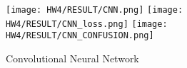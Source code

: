 \documentclass[letter, 10pt]{article}
\begin{document}
\begin{figure}[H]
        \centering
        \texttt{[image: HW4/RESULT/CNN.png]}
    \endminipage\hfill
        \centering
        \texttt{[image: HW4/RESULT/CNN\_loss.png]}
    \endminipage\hfill
        \centering
        \texttt{[image: HW4/RESULT/CNN\_CONFUSION.png]}
    \endminipage\hfill
    \caption{Convolutional Neural Network}
\end{figure}
\end{document}
